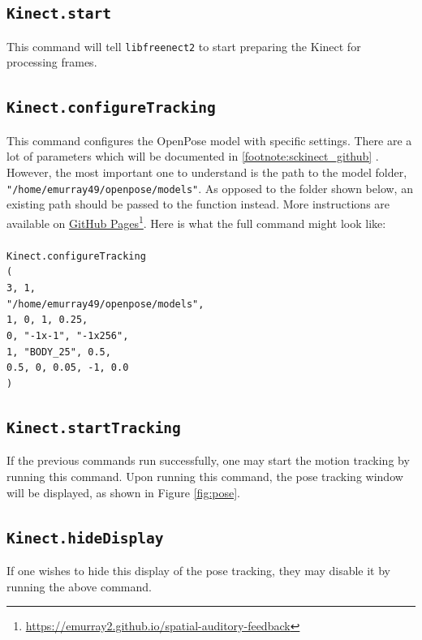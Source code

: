 \documentclass{article}
\begin{document}
\subsection{\texttt{Kinect.start}}\label{subsec:kinect_start}
This command will tell \texttt{libfreenect2} to start preparing the Kinect for processing frames.
\subsection{\texttt{Kinect.configureTracking}}\label{subsec:kinect_configure_tracking}
This command configures the OpenPose model with specific settings. There are a lot of parameters which will be documented in \cref{footnote:sckinect_github} . However, the most important one to understand is the path to the model folder, \texttt{"/home/emurray49/openpose/models"}. As opposed to the folder shown below, an existing path should be passed to the function instead. More instructions are available on \href{https://emurray2.github.io/spatial-auditory-feedback/kinect/\#openpose}{GitHub Pages}\footnote{\href{https://emurray2.github.io/spatial-auditory-feedback/kinect/\#openpose}{https://emurray2.github.io/spatial-auditory-feedback}\label{footnote:spatial_auditory_feedback_github_pages}}. Here is what the full command might look like:\\\texttt{\\
    Kinect.configureTracking\\
    (\\
    3, 1,\\
    "/home/emurray49/openpose/models",\\
    1, 0, 1, 0.25,\\
    0, "-1x-1", "-1x256",\\
    1, "BODY\_25", 0.5,\\
    0.5, 0, 0.05, -1, 0.0\\
    )
}

\subsection{\texttt{Kinect.startTracking}}\label{subsec:kinect_start_tracking}
If the previous commands run successfully, one may start the motion tracking by running this command. Upon running this command, the pose tracking window will be displayed, as shown in Figure \ref{fig:pose}.
\subsection{\texttt{Kinect.hideDisplay}}\label{subsec:kinect_hide_display}
If one wishes to hide this display of the pose tracking, they may disable it by running the above command.
\end{document}
